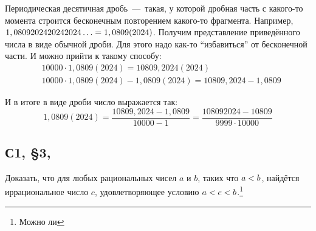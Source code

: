 \documentclass[a4paper,12pt]{article}
\begin{document}
  \begin{example}
    Периодическая десятичная дробь~---~такая, у которой дробная часть с какого-то момента строится бесконечным повторением какого-то фрагмента.
    Например, $1,0809202420242024\ldots \hm= 1,0809(2024)$.
    Получим представление приведённого числа в виде обычной дроби.
    Для этого надо как-то ``избавиться'' от бесконечной части.
    И можно прийти к такому способу:
    \[
      \begin{aligned}
        &10000 \cdot 1,0809(2024) = 10809,2024(2024)\\
        &10000 \cdot 1,0809(2024) - 1,0809(2024) = 10809,2024 - 1,0809
      \end{aligned}
    \]
    
    И в итоге в виде дроби число выражается так:
    \[
      1,0809(2024) = \frac{10809,2024 - 1,0809}{10000 - 1} = \frac{108092024 - 10809}{9999 \cdot 10000}
    \]
  \end{example}
  
  
  \subsection{С1, \S 3, }
  
  Доказать, что для любых рациональных чисел $a$ и $b$, таких что $a \hm< b$, найдётся иррациональное число $c$, удовлетворяющее условию $a \hm< c \hm< b$.\footnote{Можно ли }
  
\end{document}
